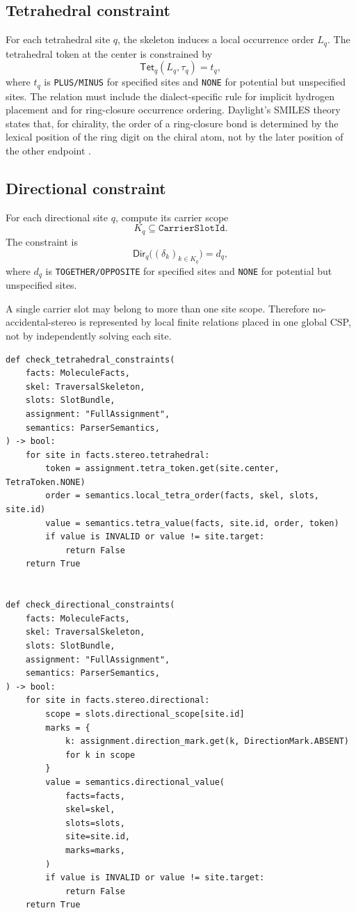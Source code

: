 \documentclass[10pt,a4paper]{article}
\newcommand{\Tet}{\mathsf{Tet}}
\newcommand{\Dir}{\mathsf{Dir}}
\theoremstyle{definition}
\theoremstyle{remark}
\begin{document}
\subsection{Tetrahedral constraint}

For each tetrahedral site \(q\), the skeleton induces a local occurrence order
\(L_q\).  The tetrahedral token at the center is constrained by
\[
   \Tet_q(L_q,\tau_q)=t_q,
\]
where \(t_q\) is \texttt{PLUS/MINUS} for specified sites and \texttt{NONE} for
potential but unspecified sites.  The relation must include the dialect-specific
rule for implicit hydrogen placement and for ring-closure occurrence ordering.
Daylight's SMILES theory states that, for chirality, the order of a ring-closure
bond is determined by the lexical position of the ring digit on the chiral atom,
not by the later position of the other endpoint \cite{daylight-smiles}.

\subsection{Directional constraint}

For each directional site \(q\), compute its carrier scope
\[
   K_q\subseteq \texttt{CarrierSlotId}.
\]
The constraint is
\[
   \Dir_q\bigl((\delta_k)_{k\in K_q}\bigr)=d_q,
\]
where \(d_q\) is \texttt{TOGETHER/OPPOSITE} for specified sites and
\texttt{NONE} for potential but unspecified sites.

A single carrier slot may belong to more than one site scope.  Therefore
no-accidental-stereo is represented by local finite relations placed in one
global CSP, not by independently solving each site.

\begin{lstlisting}
def check_tetrahedral_constraints(
    facts: MoleculeFacts,
    skel: TraversalSkeleton,
    slots: SlotBundle,
    assignment: "FullAssignment",
    semantics: ParserSemantics,
) -> bool:
    for site in facts.stereo.tetrahedral:
        token = assignment.tetra_token.get(site.center, TetraToken.NONE)
        order = semantics.local_tetra_order(facts, skel, slots, site.id)
        value = semantics.tetra_value(facts, site.id, order, token)
        if value is INVALID or value != site.target:
            return False
    return True


def check_directional_constraints(
    facts: MoleculeFacts,
    skel: TraversalSkeleton,
    slots: SlotBundle,
    assignment: "FullAssignment",
    semantics: ParserSemantics,
) -> bool:
    for site in facts.stereo.directional:
        scope = slots.directional_scope[site.id]
        marks = {
            k: assignment.direction_mark.get(k, DirectionMark.ABSENT)
            for k in scope
        }
        value = semantics.directional_value(
            facts=facts,
            skel=skel,
            slots=slots,
            site=site.id,
            marks=marks,
        )
        if value is INVALID or value != site.target:
            return False
    return True
\end{lstlisting}
\end{document}
